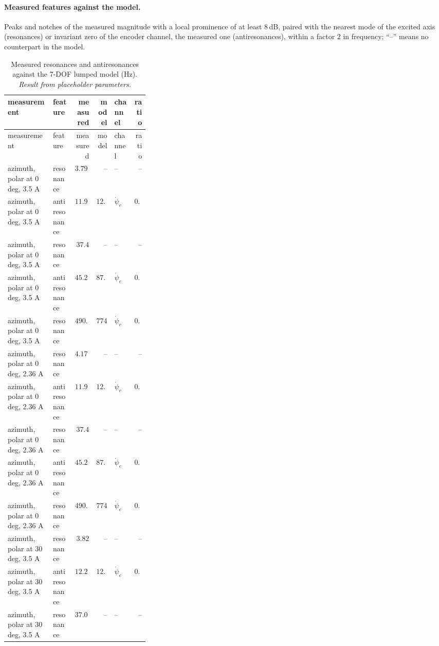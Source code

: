 \documentclass[10pt,a4paper]{article}
\numberwithin{equation}{section}
\begin{document}
\paragraph{Measured features against the model.} Peaks and notches of the measured magnitude with a local prominence of at least 8\,dB, paired with the nearest mode of the excited axis (resonances) or invariant zero of the encoder channel, the measured one (antiresonances), within a factor 2 in frequency; ``--'' means no counterpart in the model.
\begin{longtable}{p{0.32\linewidth}lrrlr}
\caption{Measured resonances and antiresonances against the 7-DOF lumped model (Hz). \emph{Result from placeholder parameters.}}\label{tab:exp_features}\\
\toprule measurement & feature & measured & model & channel & ratio \\ \midrule\endfirsthead
\toprule measurement & feature & measured & model & channel & ratio \\ \midrule\endhead
azimuth, polar at 0 deg, 3.5 A & resonance & $3.797$ & -- & -- & -- \\
azimuth, polar at 0 deg, 3.5 A & antiresonance & $11.92$ & $12.38$ & $\dot\psi_e$ & $0.963$ \\
azimuth, polar at 0 deg, 3.5 A & resonance & $37.4$ & -- & -- & -- \\
azimuth, polar at 0 deg, 3.5 A & antiresonance & $45.26$ & $87.05$ & $\dot\psi_e$ & $0.52$ \\
azimuth, polar at 0 deg, 3.5 A & resonance & $490.4$ & $774$ & $\dot\psi_e$ & $0.634$ \\
azimuth, polar at 0 deg, 2.36 A & resonance & $4.177$ & -- & -- & -- \\
azimuth, polar at 0 deg, 2.36 A & antiresonance & $11.92$ & $12.38$ & $\dot\psi_e$ & $0.963$ \\
azimuth, polar at 0 deg, 2.36 A & resonance & $37.4$ & -- & -- & -- \\
azimuth, polar at 0 deg, 2.36 A & antiresonance & $45.26$ & $87.05$ & $\dot\psi_e$ & $0.52$ \\
azimuth, polar at 0 deg, 2.36 A & resonance & $490.4$ & $774$ & $\dot\psi_e$ & $0.634$ \\
azimuth, polar at 30 deg, 3.5 A & resonance & $3.82$ & -- & -- & -- \\
azimuth, polar at 30 deg, 3.5 A & antiresonance & $12.25$ & $12.86$ & $\dot\psi_e$ & $0.953$ \\
azimuth, polar at 30 deg, 3.5 A & resonance & $37.06$ & -- & -- & -- \\

\end{longtable}
\end{document}

